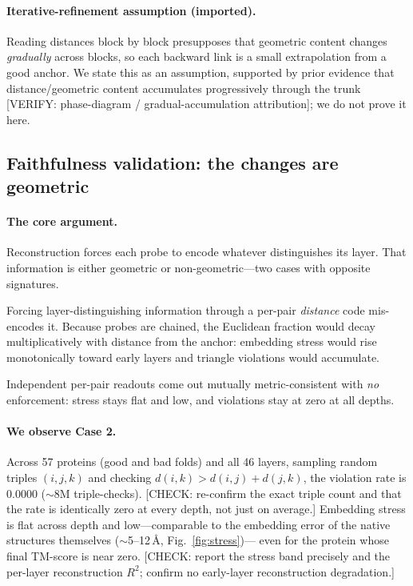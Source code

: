 \documentclass[11pt]{article}
\newcommand{\VERIFY}[1]{{\color{red}\small\textsf{[VERIFY: #1]}}}
\newcommand{\CHECK}[1]{{\color{orange!80!black}\small\textsf{[CHECK: #1]}}}
\begin{document}
\paragraph{Iterative-refinement assumption (imported).}
Reading distances block by block presupposes that geometric content changes
\emph{gradually} across blocks, so each backward link is a small extrapolation
from a good anchor. We state this as an assumption, supported by prior evidence
that distance/geometric content accumulates progressively through the trunk
\citep{lu2026phase} \VERIFY{phase-diagram / gradual-accumulation attribution}; we
do not prove it here.

\subsection{Faithfulness validation: the changes are geometric}
\label{sec:faithful-validation}

\paragraph{The core argument.}
Reconstruction forces each probe to encode whatever distinguishes its layer. That
information is either geometric or non-geometric---two cases with opposite
signatures.
\begin{description}[leftmargin=1.4em,itemsep=2pt]
\item[Case 1 (non-geometric).] Forcing layer-distinguishing information through a
  per-pair \emph{distance} code mis-encodes it. Because probes are chained, the
  Euclidean fraction would decay multiplicatively with distance from the anchor:
  embedding stress would rise monotonically toward early layers and triangle
  violations would accumulate.
\item[Case 2 (geometric).] Independent per-pair readouts come out mutually
  metric-consistent with \emph{no} enforcement: stress stays flat and low, and
  violations stay at zero at all depths.
\end{description}

\paragraph{We observe Case 2.}
Across 57 proteins (good and bad folds) and all 46 layers, sampling random
triples $(i,j,k)$ and checking $d(i,k) > d(i,j)+d(j,k)$, the violation rate is
$0.0000$ ($\sim$8M triple-checks).
\CHECK{re-confirm the exact triple count and that the rate is identically zero at
every depth, not just on average.}
Embedding stress is flat across depth and low---comparable to the embedding error
of the native structures themselves ($\sim$5--12\,\AA, Fig.~\ref{fig:stress})---
even for the protein whose final TM-score is near zero.
\CHECK{report the stress band precisely and the per-layer reconstruction $R^2$;
confirm no early-layer reconstruction degradation.}
\end{document}
